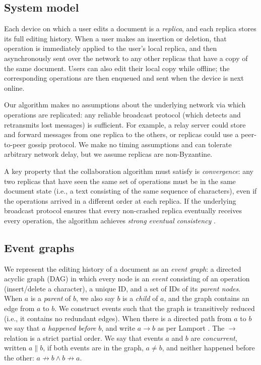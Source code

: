 \documentclass[sigplan,10pt]{acmart}
\begin{document}
\subsection{System model}

Each device on which a user edits a document is a \emph{replica}, and each replica stores its full editing history.
When a user makes an insertion or deletion, that operation is immediately applied to the user's local replica, and then asynchronously sent over the network to any other replicas that have a copy of the same document.
Users can also edit their local copy while offline; the corresponding operations are then enqueued and sent when the device is next online.

Our algorithm makes no assumptions about the underlying network via which operations are replicated: any reliable broadcast protocol (which detects and retransmits lost messages) is sufficient.
For example, a relay server could store and forward messages from one replica to the others, or replicas could use a peer-to-peer gossip protocol.
We make no timing assumptions and can tolerate arbitrary network delay, but we assume replicas are non-Byzantine.

A key property that the collaboration algorithm must satisfy is \emph{convergence}: any two replicas that have seen the same set of operations must be in the same document state (i.e., a text consisting of the same sequence of characters), even if the operations arrived in a different order at each replica.
If the underlying broadcast protocol ensures that every non-crashed replica eventually receives every operation, the algorithm achieves \emph{strong eventual consistency} \cite{Shapiro2011}.

\subsection{Event graphs}\label{event-graphs}

We represent the editing history of a document as an \emph{event graph}: a directed acyclic graph (DAG) in which every node is an \emph{event} consisting of an operation (insert/delete a character), a unique ID, and a set of IDs of its \emph{parent nodes}.
When $a$ is a \emph{parent} of $b$, we also say $b$ is a \emph{child} of $a$, and the graph contains an edge from $a$ to $b$.
We construct events such that the graph is transitively reduced (i.e., it contains no redundant edges).
When there is a directed path from $a$ to $b$ we say that $a$ \emph{happened before} $b$, and write $a \rightarrow b$ as per Lamport \cite{Lamport1978}.
The $\rightarrow$ relation is a strict partial order.
We say that events $a$ and $b$ are \emph{concurrent}, written $a \parallel b$, if both events are in the graph, $a \neq b$, and neither happened before the other: $a \not\rightarrow b \wedge b \not\rightarrow a$.
\end{document}
